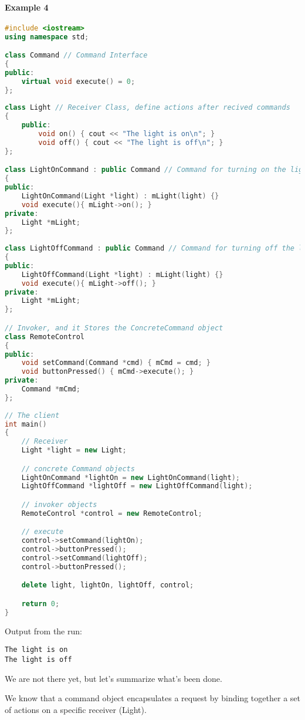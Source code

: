 \documentclass{book}
\begin{document}
\paragraph{Example 4}\mbox{}
\begin{lstlisting}[caption={Command pattern sample code 4, commandexample.cpp},label={lst:cm4},language=C++]
#include <iostream>
using namespace std;

class Command // Command Interface
{
public:
	virtual void execute() = 0;
};
 
class Light // Receiver Class, define actions after recived commands
{
    public:
    	void on() { cout << "The light is on\n"; }
    	void off() { cout << "The light is off\n"; }
}; 

class LightOnCommand : public Command // Command for turning on the light
{
public:
    LightOnCommand(Light *light) : mLight(light) {}
	void execute(){ mLight->on(); }
private:
	Light *mLight;
};
 
class LightOffCommand : public Command // Command for turning off the light
{
public:
    LightOffCommand(Light *light) : mLight(light) {}
	void execute(){ mLight->off(); }
private:
	Light *mLight;
};

// Invoker, and it Stores the ConcreteCommand object 
class RemoteControl 
{
public:
	void setCommand(Command *cmd) { mCmd = cmd; }
	void buttonPressed() { mCmd->execute(); } 
private:
	Command *mCmd;
};
 
// The client
int main() 
{
	// Receiver 
	Light *light = new Light;

	// concrete Command objects 
	LightOnCommand *lightOn = new LightOnCommand(light);
	LightOffCommand *lightOff = new LightOffCommand(light);

	// invoker objects
	RemoteControl *control = new RemoteControl;

	// execute
	control->setCommand(lightOn);
	control->buttonPressed();
	control->setCommand(lightOff);
	control->buttonPressed();

	delete light, lightOn, lightOff, control;

	return 0;
}
\end{lstlisting}
Output from the run:
\begin{verbatim}
The light is on
The light is off
\end{verbatim}

We are not there yet, but let's summarize what's been done.

We know that a command object encapsulates a request by binding together
a set of actions on a specific receiver (Light).
\end{document}
